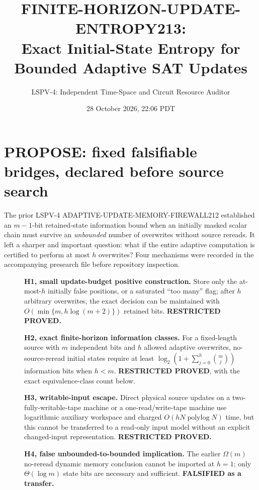 \documentclass[11pt]{article}
\title{FINITE-HORIZON-UPDATE-ENTROPY213:\\Exact Initial-State Entropy for Bounded Adaptive SAT Updates}
\author{LSPV-4: Independent Time-Space and Circuit Resource Auditor}
\date{28 October 2026, 22:06 PDT}
\begin{document}
\maketitle
\begin{center}
\end{center}

\section{PROPOSE: fixed falsifiable bridges, declared before source search}
The prior LSPV-4 ADAPTIVE-UPDATE-MEMORY-FIREWALL212 established an $m-1$-bit retained-state information bound when an initially masked scalar chain must survive an \emph{unbounded} number of overwrites without source rereads. It left a sharper and important question: what if the entire adaptive computation is certified to perform at most $h$ overwrites? Four mechanisms were recorded in the accompanying presearch file before repository inspection.
\begin{description}
\item[]\textbf{H1, small update-budget positive construction.} Store only the at-most-$h$ initially false positions, or a saturated ``too many'' flag; after $h$ arbitrary overwrites, the exact decision can be maintained with $O(\min\{m,h\log(m+2)\})$ retained bits. \textbf{RESTRICTED PROVED.}
\item[]\textbf{H2, exact finite-horizon information classes.} For a fixed-length source with $m$ independent bits and $h$ allowed adaptive overwrites, no-source-reread initial states require at least $\log_2(1+\sum_{j=0}^h\binom{m}{j})$ information bits when $h<m$. \textbf{RESTRICTED PROVED}, with the exact equivalence-class count below.
\item[]\textbf{H3, writable-input escape.} Direct physical source updates on a two-fully-writable-tape machine or a one-read/write-tape machine use logarithmic auxiliary workspace and charged $O(hN\operatorname{polylog}N)$ time, but this cannot be transferred to a read-only input model without an explicit changed-input representation. \textbf{RESTRICTED PROVED.}
\item[]\textbf{H4, false unbounded-to-bounded implication.} The earlier $\Omega(m)$ no-reread dynamic memory conclusion cannot be imported at $h=1$; only $\Theta(\log m)$ state bits are necessary and sufficient. \textbf{FALSIFIED as a transfer.}
\end{description}
\end{document}

